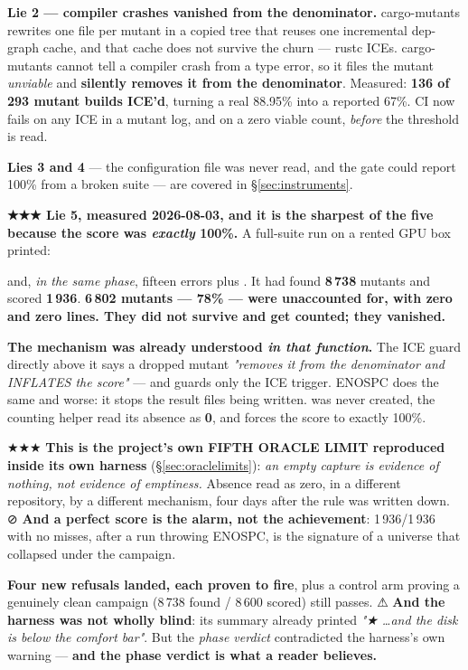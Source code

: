 \documentclass[10.5pt]{article}
\begin{document}
\textbf{Lie 2 — compiler crashes vanished from the denominator.} cargo-mutants rewrites one file
per mutant in a copied tree that reuses one incremental dep-graph cache, and that cache does not
survive the churn — rustc ICEs. cargo-mutants cannot tell a compiler crash from a type error, so
it files the mutant \emph{unviable} and \textbf{silently removes it from the denominator}.
Measured: \textbf{136 of 293 mutant builds ICE'd}, turning a real 88.95\% into a reported 67\%. CI
now fails on any ICE in a mutant log, and on a zero viable count, \emph{before} the threshold is
read.

\textbf{Lies 3 and 4} — the configuration file was never read, and the gate could report 100\%
from a broken suite — are covered in \S\ref{sec:instruments}.

\begin{warnbox}\small
\textbf{★★★ Lie 5, measured 2026-08-03, and it is the sharpest of the five because the score was
\emph{exactly} 100\%.} A full-suite run on a rented GPU box printed:

\begin{center}\end{center}

\noindent
and, \emph{in the same phase}, fifteen  errors plus . It had found \textbf{8\,738} mutants and scored \textbf{1\,936}.
\textbf{6\,802 mutants — 78\% — were unaccounted for, with zero  and zero
 lines. They did not survive and get counted; they vanished.}

\smallskip
\textbf{The mechanism was already understood \emph{in that function}.} The ICE guard directly
above it says a dropped mutant \emph{"removes it from the denominator and INFLATES the score"} —
and guards only the ICE trigger. ENOSPC does the same and worse: it stops the result files being
written.  was never created, the counting helper read its absence as \textbf{0},
and  forces the score to exactly 100\%.

\smallskip
★★★ \textbf{This is the project's own FIFTH ORACLE LIMIT reproduced inside its own harness}
(\S\ref{sec:oraclelimits}): \emph{an empty capture is evidence of nothing, not evidence of
emptiness.} Absence read as zero, in a different repository, by a different mechanism, four days
after the rule was written down. ⊘ \textbf{And a perfect score is the alarm, not the
achievement}: 1\,936/1\,936 with no misses, after a run throwing ENOSPC, is the signature of a
universe that collapsed under the campaign.

\smallskip
\textbf{Four new refusals landed, each proven to fire}, plus a control arm proving a genuinely
clean campaign (8\,738 found / 8\,600 scored) still passes. ⚠ \textbf{And the harness was not
wholly blind}: its summary already printed \emph{"★ …and the disk is below the comfort bar"}. But
the \emph{phase verdict} contradicted the harness's own warning — \textbf{and the phase verdict
is what a reader believes.}
\end{warnbox}
\end{document}
